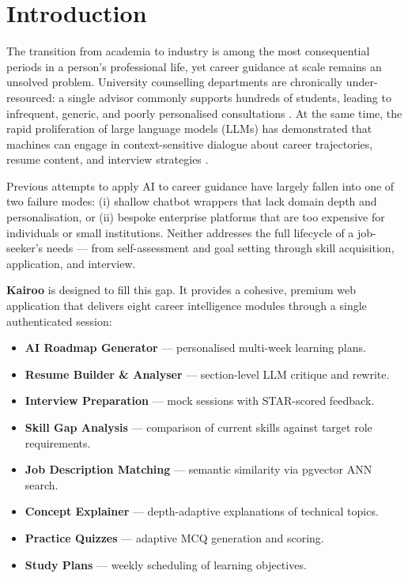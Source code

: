 \documentclass[conference]{IEEEtran}
\begin{document}
\section{Introduction}

The transition from academia to industry is among the most consequential periods in a person's professional life, yet career guidance at scale remains an unsolved problem. University counselling departments are chronically under-resourced: a single advisor commonly supports hundreds of students, leading to infrequent, generic, and poorly personalised consultations \cite{nacac2020}. At the same time, the rapid proliferation of large language models (LLMs) has demonstrated that machines can engage in context-sensitive dialogue about career trajectories, resume content, and interview strategies \cite{brown2020gpt3,openai2023gpt4}.

Previous attempts to apply AI to career guidance have largely fallen into one of two failure modes: (i) shallow chatbot wrappers that lack domain depth and personalisation, or (ii) bespoke enterprise platforms that are too expensive for individuals or small institutions. Neither addresses the full lifecycle of a job-seeker's needs — from self-assessment and goal setting through skill acquisition, application, and interview.

\textbf{Kairoo} is designed to fill this gap. It provides a cohesive, premium web application that delivers eight career intelligence modules through a single authenticated session:
\begin{itemize}
  \item \textbf{AI Roadmap Generator} --- personalised multi-week learning plans.
  \item \textbf{Resume Builder \& Analyser} --- section-level LLM critique and rewrite.
  \item \textbf{Interview Preparation} --- mock sessions with STAR-scored feedback.
  \item \textbf{Skill Gap Analysis} --- comparison of current skills against target role requirements.
  \item \textbf{Job Description Matching} --- semantic similarity via pgvector ANN search.
  \item \textbf{Concept Explainer} --- depth-adaptive explanations of technical topics.
  \item \textbf{Practice Quizzes} --- adaptive MCQ generation and scoring.
  \item \textbf{Study Plans} --- weekly scheduling of learning objectives.
\end{itemize}
\end{document}
